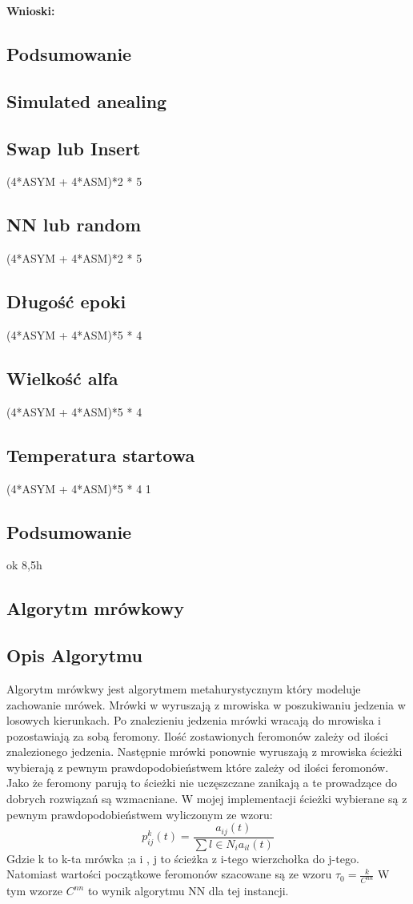 \documentclass{article}
\begin{document}
        \textbf{Wnioski: } 

      \subsection{Podsumowanie}
    \subsection{Simulated anealing}
      \subsection{Swap lub Insert}
        (4*ASYM + 4*ASM)*2 * 5 
      \subsection{NN lub random}
        (4*ASYM + 4*ASM)*2 * 5 
      \subsection{Długość epoki}
        (4*ASYM + 4*ASM)*5 * 4 
      \subsection{Wielkość alfa}
        (4*ASYM + 4*ASM)*5 * 4 
      \subsection{Temperatura startowa}
        (4*ASYM + 4*ASM)*5 * 4 1
      \subsection{Podsumowanie}ok 8,5h

    \subsection{Algorytm mrówkowy}
      \subsection{Opis Algorytmu}
        Algorytm mrówkwy jest algorytmem metahurystycznym który modeluje zachowanie mrówek.
        Mrówki w wyruszają z mrowiska w poszukiwaniu jedzenia w losowych kierunkach. Po 
        znalezieniu jedzenia mrówki wracają do mrowiska i pozostawiają za sobą feromony.
        Ilość zostawionych feromonów zależy od ilości znalezionego jedzenia. Następnie
        mrówki ponownie wyruszają z mrowiska ścieżki wybierają z pewnym prawdopodobieństwem
        które zależy od ilości feromonów. Jako że feromony parują to ścieżki nie uczęszczane
        zanikają a te prowadzące do dobrych rozwiązań są wzmacniane.\linebreak
        W mojej implementacji ścieżki wybierane są z pewnym prawdopodobieństwem 
        wyliczonym ze wzoru:  \[
            p_{ij}^k(t) = \frac{a_{ij}(t)}{\sum{l\in N_i}a_{il}(t)}
        \]
        Gdzie k to k-ta mrówka ;a i , j to ścieżka z i-tego wierzchołka do j-tego.
        Natomiast wartości początkowe feromonów szacowane są ze wzoru $\tau_0 = \frac{k}{C^{nn}}$
        W tym wzorze $C^{nn}$ to wynik algorytmu NN dla tej instancji.
\end{document}
